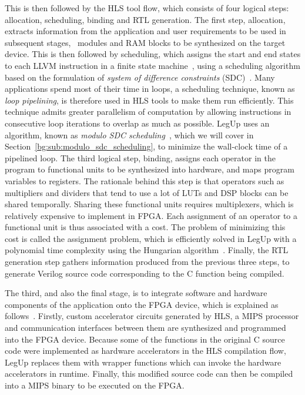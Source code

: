 This is then followed by the HLS tool flow, which consists of four logical
steps: allocation, scheduling, binding and RTL generation.  The first
step, allocation, extracts information from the application and user
requirements to be used in subsequent stages, \eg~modules and RAM blocks to
be synthesized on the target device.  This is then followed by scheduling,
which assigns the start and end states to each LLVM instruction in a finite
state machine~\cite{legup}, using a scheduling algorithm based on the
formulation of \emph{system of difference constraints} (SDC)~\cite{legup,
canis13, cong06}.  Many applications spend most of their time in loops, a
scheduling technique, known as \emph{loop pipelining}, is therefore used
in HLS tools to make them run efficiently.  This technique admits greater
parallelism of computation by allowing instructions in consecutive loop
iterations to overlap as much as possible.  LegUp uses an algorithm, known
as \emph{modulo SDC scheduling}~\cite{canis14}, which we will cover in
Section~\ref{bg:sub:modulo_sdc_scheduling}, to minimize the wall-clock time
of a pipelined loop.  The third logical step, binding, assigns each operator
in the program to functional units to be synthesized into hardware, and maps
program variables to registers.  The rationale behind this step is that
operators such as multipliers and dividers that tend to use a lot of LUTs and
DSP blocks can be shared temporally.  Sharing these functional units requires
multiplexers, which is relatively expensive to implement in FPGA\@.  Each
assignment of an operator to a functional unit is thus associated with a cost.
The problem of minimizing this cost is called the assignment problem, which
is efficiently solved in LegUp with a polynomial time complexity using the
Hungarian algorithm~\cite{canis13, kuhn10}.  Finally, the RTL generation step
gathers information produced from the previous three steps, to generate Verilog
source code corresponding to the C function being compiled.

The third, and also the final stage, is to integrate software and hardware
components of the application onto the FPGA device, which is explained as
follows~\cite{canis13}.  Firstly, custom accelerator circuits generated by HLS,
a MIPS processor and communication interfaces between them are synthesized
and programmed into the FPGA device.  Because some of the functions in the
original C source code were implemented as hardware accelerators in the HLS
compilation flow, LegUp replaces them with wrapper functions which can invoke
the hardware accelerators in runtime.  Finally, this modified source code can
then be compiled into a MIPS binary to be executed on the FPGA\@.


